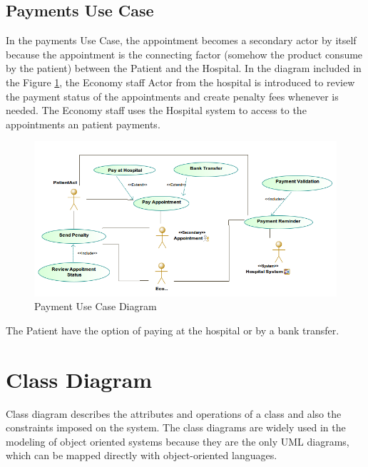 \documentclass{article}
\begin{document}
            \subsection{Payments Use Case}

            In the payments Use Case, the appointment becomes a secondary actor by itself because the appointment is the connecting factor (somehow the product consume by the patient) between the Patient and the
            Hospital. In the diagram included in the Figure  \ref{fig:payment}, the Economy staff Actor from the hospital is introduced to review the payment status of the appointments and create penalty fees whenever is needed.
            The Economy staff uses the Hospital system to access to the appointments an patient payments.

            \begin{figure}[H]
                \centering 
                \includegraphics[width=1\linewidth]{./img/payments.png}
                \caption{Payment Use Case Diagram}
                \label{fig:payment}
            \end{figure}

            The Patient have the option of paying at the hospital or by a bank transfer.
            
            \section{Class Diagram} %
            Class diagram describes the attributes and operations of a class and also the constraints 
            imposed on the system. The class diagrams are widely used in the modeling of object oriented 
            systems because they are the only UML diagrams, which can be mapped directly with object-oriented languages.
            
\end{document}
